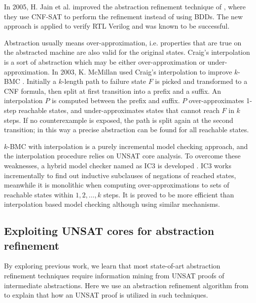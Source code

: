 In 2005, H. Jain et al.\cite{HimanshuDAC2005} improved the abstraction refinement technique of \cite{clarke2000counterexample},
where they use CNF-SAT to perform the refinement instead of using BDDs. The new approach is applied to verify RTL Verilog
and was known to be successful.

Abstraction usually means over-approximation, i.e. properties that are true on the abstracted machine
are also valid for the original states. Craig's interpolation is a sort of abstraction which may be either
over-approximation or under-approximation. In 2003, K. McMillan used Craig's interpolation to improve 
$k$-BMC \cite{mcmillan2003interpolation}. Initially a $k$-length path to failure state $F$ is picked and transformed to 
a CNF formula, then split at first transition into a prefix and a suffix. An interpolation $P$ is computed
between the prefix and suffix. $P$ over-approximates 1-step reachable states, and under-approximates states 
that cannot reach $F$ in $k$ steps. If no counterexample is exposed, the path is split again at the second
transition; in this way a precise abstraction can be found for all reachable states.

$k$-BMC with interpolation is a purely incremental model checking approach, and the interpolation procedure relies
on UNSAT core analysis. To overcome these weaknesses, a hybrid model checker named as IC3 is developed 
\cite{bradley2011sat} \cite{bradley2011incremental}. IC3 works incrementally to find out inductive subclauses
of negations of reached states, meanwhile it is monolithic when computing over-approximations to sets of reachable
states within $1,2,\dots,k$ steps. It is proved to be more efficient than interpolation based model checking
although using similar mechanisms.

\subsection{Exploiting UNSAT cores for abstraction refinement}
By exploring previous work, we learn that most state-of-art abstraction refinement techniques require 
information mining from UNSAT proofs of intermediate abstractions. 
Here we use an abstraction refinement algorithm from \cite{zhang2005design} to explain that how an UNSAT proof is
utilized in such techniques.

